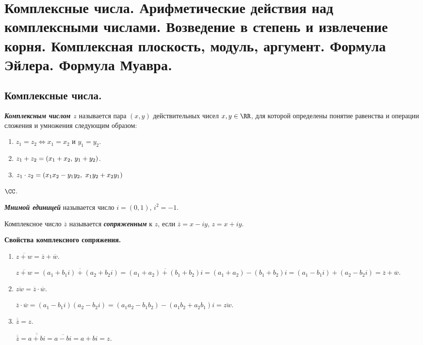 \section{
    Комплексные числа. Арифметические действия над комплексными числами. Возведение в степень и извлечение корня. Комплексная плоскость, модуль, аргумент. Формула Эйлера. Формула Муавра.
}

\subsection{
    Комплексные числа.
}

\begin{definition}
    \textbf{\textit{Комплексным числом $z$}} называется пара $(x, y)$ действительных чисел $x, y \in \RR$, для которой определены понятие равенства и операции сложения и умножения следующим образом:
    
    \begin{enumerate}[nosep]
        \item $z_1 = z_2 \iff x_1 = x_2$ и $y_1 = y_2$.
        \item $z_1 + z_2 = (x_1 + x_2, \thinspace y_1 + y_2)$.
        \item $z_1 \cdot z_2 = (x_1x_2 - y_1y_2, \thinspace \thinspace x_1y_2 + x_2y_1)$
    \end{enumerate}
\end{definition}

\begin{designation}
    $\CC$.
\end{designation}

\begin{definition}
    \textbf{\textit{Мнимой единицей}} называется число $i = (0, 1)$, $i^2 = -1$.
\end{definition}

\begin{definition}
    Комплексное число $\overline{z}$ называется \textbf{\textit{сопряженным}} к $z$, если $\overline{z} = x - iy$, $z = x + iy$.
\end{definition}

\textbf{Свойства комплексного сопряжения.}

\begin{enumerate}[label={\arabic*°.}]
    \item $\overline{z + w} = \overline{z} + \overline{w}.$
    
    $\overline{z + w} = \overline{(a_1 + b_1 i) + (a_2 + b_2 i)} = \overline{(a_1 + a_2) + (b_1 + b_2) i} = (a_1 + a_2) - (b_1 + b_2)i = (a_1 - b_1 i) + (a_2 - b_2 i) = \overline{z} + \overline{w}.$
    
    \item $\overline{zw} = \overline{z} \cdot \overline{w}.$
    
    $\overline{z} \cdot \overline{w} = (a_1 - b_1 i) (a_2 - b_2 i) = (a_1 a_2 - b_1 b_2) - (a_1 b_2 + a_2 b_1) i = \overline{zw}.$

    \item $\overline{\overline{z}} = z.$

    $\overline{\overline{z}} = \overline{\overline{a + bi}} = \overline{a - bi} = a + bi = z.$
\end{enumerate}


